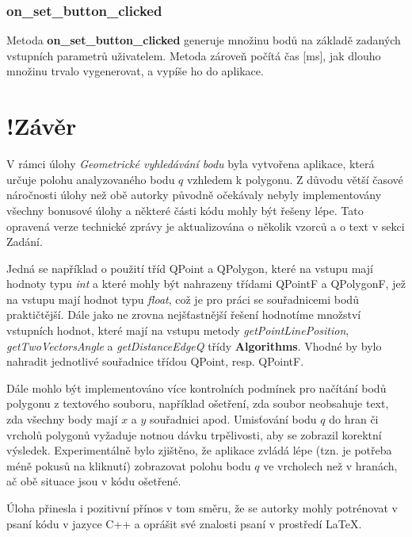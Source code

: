 \documentclass[a4paper, 12pt]{article}
\begin{document}
\subsubsection{on\_set\_button\_clicked}
Metoda \textbf{on\_set\_button\_clicked} generuje množinu bodů na základě zadaných vstupních parametrů uživatelem. Metoda zároveň počítá čas [ms], jak dlouho množinu trvalo vygenerovat, a vypíše ho do aplikace.

\clearpage
\section{!Závěr}
V rámci úlohy \textit{Geometrické vyhledávání bodu} byla vytvořena aplikace, která určuje polohu analyzovaného bodu $q$ vzhledem k polygonu. Z důvodu větší časové náročnosti úlohy než obě autorky původně očekávaly nebyly implementovány všechny bonusové úlohy a některé části kódu mohly být řešeny lépe. Tato opravená verze technické zprávy je aktualizována o několik vzorců a o text v sekci Zadání. 

Jedná se například o použití tříd QPoint a QPolygon, které na vstupu mají hodnoty typu \textit{int} a které mohly být nahrazeny třídami QPointF a QPolygonF, jež na vstupu mají hodnot typu \textit{float}, což je pro práci se souřadnicemi bodů praktičtější. Dále jako ne zrovna nejšťastnější řešení hodnotíme množství vstupních hodnot, které mají na vstupu metody \textit{getPointLinePosition}, \textit{getTwoVectorsAngle} a \textit{getDistanceEdgeQ} třídy \textbf{Algorithms}. Vhodné by bylo nahradit jednotlivé souřadnice třídou QPoint, resp. QPointF. 

Dále mohlo být implementováno více kontrolních podmínek pro načítání bodů polygonu z textového souboru, například ošetření, zda soubor neobsahuje text, zda všechny body mají $x$ a $y$ souřadnici apod. Umisťování bodu $q$ do hran či vrcholů polygonů vyžaduje notnou dávku trpělivosti, aby se zobrazil korektní výsledek. Experimentálně bylo zjištěno, že aplikace zvládá lépe (tzn. je potřeba méně pokusů na kliknutí) zobrazovat polohu bodu $q$ ve vrcholech než v hranách, ač obě situace jsou v kódu ošetřené. 

Úloha přinesla i pozitivní přínos v tom směru, že se autorky mohly potrénovat v psaní kódu v jazyce C++ a oprášit své znalosti psaní v prostředí LaTeX.

\clearpage
\end{document}
